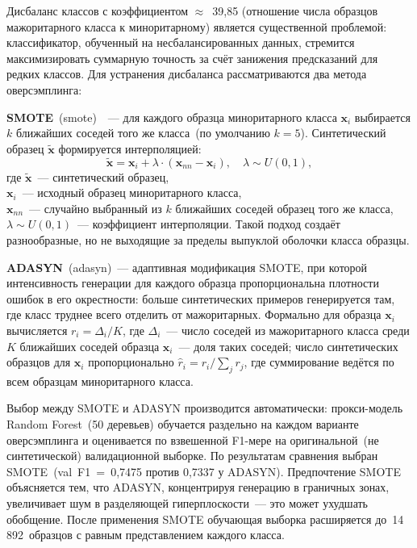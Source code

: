 Дисбаланс классов с коэффициентом $\approx$~39,85 (отношение числа образцов мажоритарного класса к миноритарному) является существенной проблемой: классификатор, обученный на несбалансированных данных, стремится максимизировать суммарную точность за счёт занижения предсказаний для редких классов. Для устранения дисбаланса рассматриваются два метода оверсэмплинга:

\textbf{SMOTE}~(\acrlong{smote})~\cite{smote_paper}~--- для каждого образца миноритарного класса $\mathbf{x}_i$ выбирается $k$ ближайших соседей того же класса~(по умолчанию $k=5$). Синтетический образец $\tilde{\mathbf{x}}$ формируется интерполяцией:
\begin{equation}\label{eq:smote}
    \tilde{\mathbf{x}} = \mathbf{x}_i + \lambda \cdot (\mathbf{x}_{nn} - \mathbf{x}_i), \quad \lambda \sim U(0, 1),
\end{equation}
где $\tilde{\mathbf{x}}$~--- синтетический образец, \\ $\mathbf{x}_i$~--- исходный образец миноритарного класса, \\ $\mathbf{x}_{nn}$~--- случайно выбранный из $k$ ближайших соседей образец того же класса, \\ $\lambda \sim U(0,1)$~--- коэффициент интерполяции. Такой подход создаёт разнообразные, но не выходящие за пределы выпуклой оболочки класса образцы.

\textbf{ADASYN}~(\acrlong{adasyn})~--- адаптивная модификация SMOTE, при которой интенсивность генерации для каждого образца пропорциональна плотности ошибок в его окрестности: больше синтетических примеров генерируется там, где класс труднее всего отделить от мажоритарных. Формально для образца $\mathbf{x}_i$ вычисляется $r_i = \Delta_i / K$, где $\Delta_i$~--- число соседей из мажоритарного класса среди $K$ ближайших соседей образца $\mathbf{x}_i$~--- доля таких соседей; число синтетических образцов для $\mathbf{x}_i$ пропорционально $\hat{r}_i = r_i / \sum_j r_j$, где суммирование ведётся по всем образцам миноритарного класса.

Выбор между SMOTE и ADASYN производится автоматически: прокси-модель Random Forest~(50 деревьев) обучается раздельно на каждом варианте оверсэмплинга и оценивается по взвешенной F1-мере на оригинальной~(не синтетической) валидационной выборке. По результатам сравнения выбран SMOTE~(val~F1~=~0,7475 против 0,7337 у ADASYN). Предпочтение SMOTE объясняется тем, что ADASYN, концентрируя генерацию в граничных зонах, увеличивает шум в разделяющей гиперплоскости~--- это может ухудшать обобщение. После применения SMOTE обучающая выборка расширяется до~14\,892~образцов с равным представлением каждого класса.

